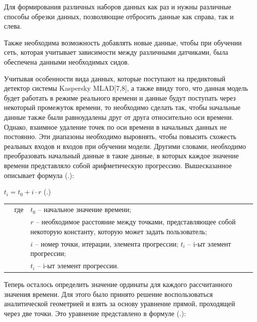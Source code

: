 {  \par \redline Для формирования различных наборов данных как раз и нужны различные способы обрезки данных, позволяющие отбросить данные как справа, так и слева. 

  \par \redline Также необходима возможность добавлять новые данные, чтобы при обучении сеть, которая учитывает зависимости между различными датчиками, была обеспечена данными необходимых сидов.  

  \par \redline Учитывая особенности вида данных, которые поступают на предиктовый детектор системы Kaspersky MLAD[7,8], а также ввиду того, что данная модель будет работать в режиме реального времени и данные будут поступать через некоторый промежуток времени, то необходимо сделать так, чтобы начальные данные также были равноудалены друг от друга относительно оси времени. Однако, взаимное удаление точек по оси времени в начальных данных не постоянно. Эти диапазоны необходимо выровнять, чтобы повысить схожесть реальных входов и входов при обучении модели. Другими словами, необходимо преобразовать начальный данные в такие данные, в которых каждое значение времени представляло собой арифметическую прогрессию. Вышесказанное описывает формула (\thechaptercntr .\theformulacntr):

	\formulaspace \par \redline 
    $t_i = t_0 + i \cdot r$
	  \hfill (\thechaptercntr .\theformulacntr) \redline
	\formulaspace \addtocounter{formulacntr}{1}

  \begin{tabular}{p{}p{}p{}}
		& где  & $t_0$ {--} начальное значение времени; \\
		& 	   & $r$ {--} необходимое расстояние между точками, представляющее собой некоторую константу, которую может задать пользователь; \\
    & 	   & $i$ {--} номер точки, итерации, элемента прогрессии; $t_i$ {--} i-ыт элемент прогрессии;  \\
    & 	   & $t_i$ {--} i-ыт элемент прогрессии. \\
  \end{tabular}

  \par \redline Теперь осталось определить значение ординаты для каждого рассчитанного значения времени. Для этого было принято решение воспользоваться аналитической геометрией и взять за основу уравнение прямой, проходящей через две точки. Это уравнение представлено в формуле (\thechaptercntr .\theformulacntr):  

}
